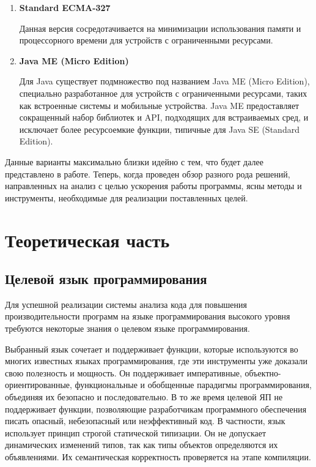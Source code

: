\documentclass{mipt-thesis-bs}
\begin{document}
\begin{enumerate}
        \item \textbf{Standard ECMA-327}

        Данная версия сосредотачивается на минимизации использования памяти и
        процессорного времени для устройств с ограниченными ресурсами.

        \item \textbf{Java ME (Micro Edition)}

        Для Java существует подмножество под названием Java ME (Micro Edition),
        специально разработанное для устройств с ограниченными ресурсами, таких
        как встроенные системы и мобильные устройства. Java ME предоставляет
        сокращенный набор библиотек и API, подходящих для встраиваемых сред,
        и исключает более ресурсоемкие функции, типичные для Java SE (Standard Edition).
\end{enumerate}

Данные варианты максимально близки идейно с тем, что будет далее представлено в работе.
Теперь, когда проведен обзор разного рода решений, направленных на анализ с целью ускорения
работы программы, ясны методы и инструменты, необходимые для реализации поставленных целей.


\chapter{Теоретическая часть}

\section{Целевой язык программирования}

Для успешной реализации системы анализа кода для повышения производительности программ на
языке программирования высокого уровня требуются некоторые знания о целевом языке программирования.

Выбранный язык сочетает и поддерживает функции, которые используются во многих известных
языках программирования, где эти инструменты уже доказали свою полезность и мощность.
Он поддерживает императивные, объектно-ориентированные, функциональные и обобщенные
 парадигмы программирования, объединяя их безопасно и последовательно.
В то же время целевой ЯП не поддерживает функции, позволяющие разработчикам
программного обеспечения писать опасный, небезопасный или неэффективный код.
В частности, язык использует принцип строгой статической типизации. Он не допускает
динамических изменений типов, так как типы объектов определяются их объявлениями.
Их семантическая корректность проверяется на этапе компиляции.
\end{document}
